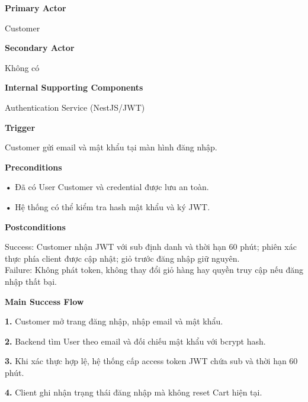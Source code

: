 \documentclass[11pt,a4paper,oneside]{report}
\begin{document}
\par\smallskip\noindent\textcolor{sgublue}{\textbf{Primary Actor}}\par\nobreak
Customer
\par

\par\smallskip\noindent\textcolor{sgublue}{\textbf{Secondary Actor}}\par\nobreak
Không có
\par

\par\smallskip\noindent\textcolor{sgublue}{\textbf{Internal Supporting Components}}\par\nobreak
Authentication Service (NestJS/JWT)
\par

\par\smallskip\noindent\textcolor{sgublue}{\textbf{Trigger}}\par\nobreak
Customer gửi email và mật khẩu tại màn hình đăng nhập.
\par

\par\smallskip\noindent\textcolor{sgublue}{\textbf{Preconditions}}\par\nobreak
\textbf{•} Đã có User Customer và credential được lưu an toàn.

\textbf{•} Hệ thống có thể kiểm tra hash mật khẩu và ký JWT.
\par

\par\smallskip\noindent\textcolor{sgublue}{\textbf{Postconditions}}\par\nobreak
Success: Customer nhận JWT với sub định danh và thời hạn 60 phút; phiên xác thực phía client được cập nhật; giỏ trước đăng nhập giữ nguyên.\\
Failure: Không phát token, không thay đổi giỏ hàng hay quyền truy cập nếu đăng nhập thất bại.\strut
\par

\par\smallskip\noindent\textcolor{sgublue}{\textbf{Main Success Flow}}\par\nobreak
\textbf{1.} Customer mở trang đăng nhập, nhập email và mật khẩu.

\textbf{2.} Backend tìm User theo email và đối chiếu mật khẩu với bcrypt hash.

\textbf{3.} Khi xác thực hợp lệ, hệ thống cấp access token JWT chứa sub và thời hạn 60 phút.

\textbf{4.} Client ghi nhận trạng thái đăng nhập mà không reset Cart hiện tại.
\end{document}
